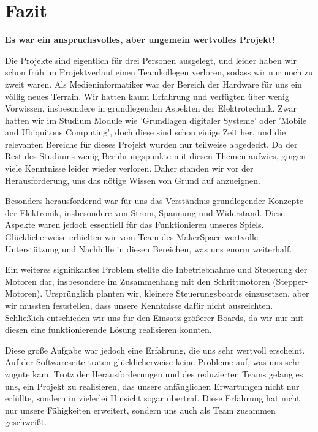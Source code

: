 \section{Fazit}

\textbf{Es war ein anspruchsvolles, aber ungemein wertvolles Projekt!}

Die Projekte sind eigentlich für drei Personen ausgelegt, und leider haben wir schon früh im Projektverlauf einen Teamkollegen verloren, sodass wir nur noch zu zweit waren. Als Medieninformatiker war der Bereich der Hardware für uns ein völlig neues Terrain. Wir hatten kaum Erfahrung und verfügten über wenig Vorwissen, insbesondere in grundlegenden Aspekten der Elektrotechnik. Zwar hatten wir im Studium Module wie 'Grundlagen digitaler Systeme' oder 'Mobile and Ubiquitous Computing', doch diese sind schon einige Zeit her, und die relevanten Bereiche für dieses Projekt wurden nur teilweise abgedeckt. Da der Rest des Studiums wenig Berührungspunkte mit diesen Themen aufwies, gingen viele Kenntnisse leider wieder verloren. Daher standen wir vor der Herausforderung, uns das nötige Wissen von Grund auf anzueignen.

Besonders herausfordernd war für uns das Verständnis grundlegender Konzepte der Elektronik, insbesondere von Strom, Spannung und Widerstand. Diese Aspekte waren jedoch essentiell für das Funktionieren unseres Spiels. Glücklicherweise erhielten wir vom Team des MakerSpace wertvolle Unterstützung und Nachhilfe in diesen Bereichen, was uns enorm weiterhalf.

Ein weiteres signifikantes Problem stellte die Inbetriebnahme und Steuerung der Motoren dar, insbesondere im Zusammenhang mit den Schrittmotoren (Stepper-Motoren). Ursprünglich planten wir, kleinere Steuerungsboards einzusetzen, aber wir mussten feststellen, dass unsere Kenntnisse dafür nicht ausreichten. Schließlich entschieden wir uns für den Einsatz größerer Boards, da wir nur mit diesen eine funktionierende Lösung realisieren konnten.

Diese große Aufgabe war jedoch eine Erfahrung, die uns sehr wertvoll erscheint. Auf der Softwareseite traten glücklicherweise keine Probleme auf, was uns sehr zugute kam. Trotz der Herausforderungen und des reduzierten Teams gelang es uns, ein Projekt zu realisieren, das unsere anfänglichen Erwartungen nicht nur erfüllte, sondern in vielerlei Hinsicht sogar übertraf. Diese Erfahrung hat nicht nur unsere Fähigkeiten erweitert, sondern uns auch als Team zusammen geschweißt.